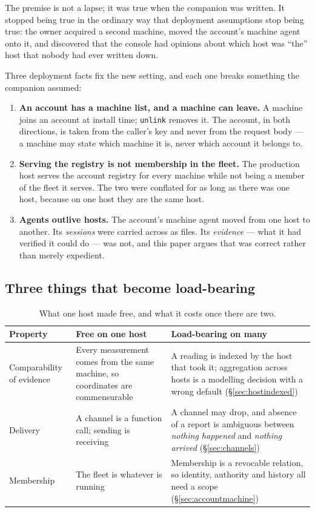 \documentclass[11pt]{article}
\newcommand{\code}[1]{\texttt{\small #1}}
\begin{document}
The premise is not a lapse; it was true when the companion was written. It stopped being true in the ordinary way that deployment assumptions stop being true: the owner acquired a second machine, moved the account's machine agent onto it, and discovered that the console had opinions about which host was ``the'' host that nobody had ever written down.

Three deployment facts fix the new setting, and each one breaks something the companion assumed:

\begin{enumerate}
\item \textbf{An account has a machine list, and a machine can leave.} A machine joins an account at install time; \code{unlink} removes it. The account, in both directions, is taken from the caller's key and never from the request body --- a machine may state which machine it is, never which account it belongs to.
\item \textbf{Serving the registry is not membership in the fleet.} The production host serves the account registry for every machine while not being a member of the fleet it serves. The two were conflated for as long as there was one host, because on one host they are the same host.
\item \textbf{Agents outlive hosts.} The account's machine agent moved from one host to another. Its \emph{sessions} were carried across as files. Its \emph{evidence} --- what it had verified it could do --- was not, and this paper argues that was correct rather than merely expedient.
\end{enumerate}

\subsection{Three things that become load-bearing}

\begin{table}[h]
\centering\small
\caption{What one host made free, and what it costs once there are two.}
\label{tab:threethings}
\begin{tabular}{@{}L{3.3cm}L{4.6cm}L{6.0cm}@{}}
\toprule
\textbf{Property} & \textbf{Free on one host} & \textbf{Load-bearing on many} \\
\midrule
Comparability of evidence & Every measurement comes from the same machine, so coordinates are commensurable & A reading is indexed by the host that took it; aggregation across hosts is a modelling decision with a wrong default (\S\ref{sec:hostindexed}) \\
Delivery & A channel is a function call; sending is receiving & A channel may drop, and absence of a report is ambiguous between \emph{nothing happened} and \emph{nothing arrived} (\S\ref{sec:channels}) \\
Membership & The fleet is whatever is running & Membership is a revocable relation, so identity, authority and history all need a scope (\S\ref{sec:accountmachine}) \\
\bottomrule
\end{tabular}
\end{table}
\end{document}
